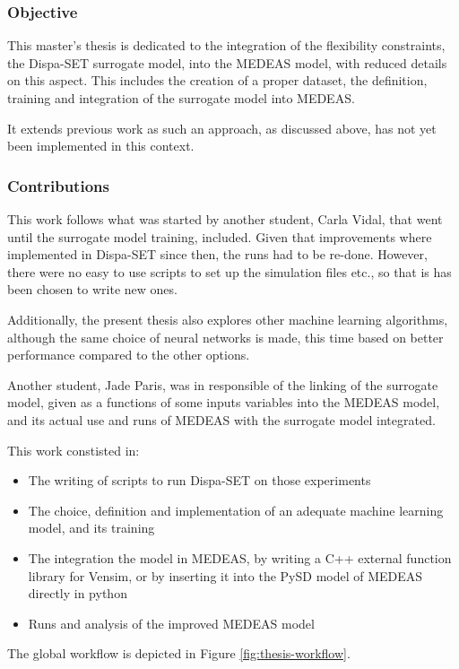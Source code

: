 \subsubsection{Objective}

This master's thesis is dedicated to the integration of the flexibility constraints, the Dispa-SET surrogate model, into the MEDEAS model, with reduced details on this aspect. This includes the creation of a proper dataset, the definition, training and integration of the surrogate model into MEDEAS.
 
It extends previous work as such an approach, as discussed above, has not yet been implemented in this context.

\subsubsection{Contributions}

This work follows what was started by another student, Carla Vidal, that went until the surrogate model training, included. Given that improvements where implemented in Dispa-SET since then, the runs had to be re-done. However, there were no easy to use scripts to set up the simulation files etc., so that is has been chosen to write new ones.

Additionally, the present thesis also explores other machine learning algorithms, although the same choice of neural networks is made, this time based on better performance compared to the other options.

Another student, Jade Paris, was in responsible of the linking of the surrogate model, given as a functions of some inputs variables into the MEDEAS model, and its actual use and runs of MEDEAS with the surrogate model integrated.

This work constisted in:
\begin{itemize}
    \item The writing of scripts to run Dispa-SET on those experiments
    \item The choice, definition and implementation of an adequate machine learning model, and its training
    \item The integration the model in MEDEAS, by writing a C++ external function library for Vensim, or by inserting it into the PySD model of MEDEAS directly in python
    \item Runs and analysis of the improved MEDEAS model
\end{itemize}

The global workflow is depicted in Figure \ref{fig:thesis-workflow}.

